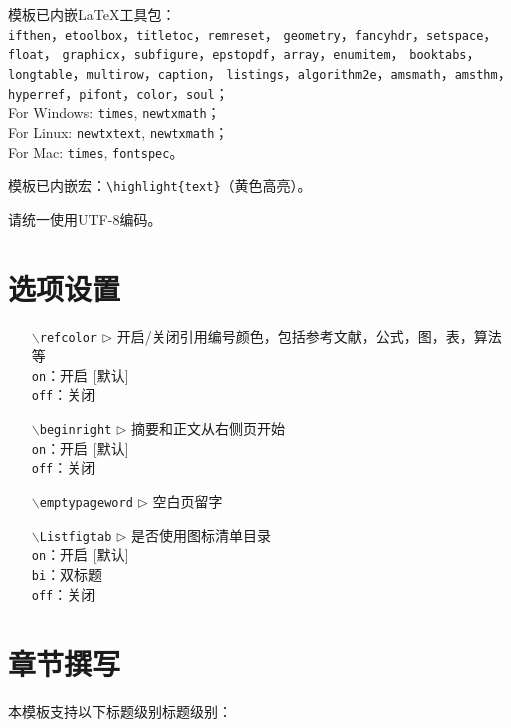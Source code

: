 \setlength{\hangindent}{4em}
模板已内嵌LaTeX工具包：\\
{\tt ifthen}，{\tt etoolbox}，{\tt titletoc}，{\tt remreset}，
{\tt geometry}，{\tt fancyhdr}，{\tt setspace}，{\tt float}，
{\tt graphicx}，{\tt subfigure}，{\tt epstopdf}，{\tt array}，{\tt enumitem}，
{\tt booktabs}，{\tt longtable}，{\tt multirow}，{\tt caption}，
{\tt listings}，{\tt algorithm2e}，{\tt amsmath}，{\tt amsthm}，
{\tt hyperref}，{\tt pifont}，{\tt color}，{\tt soul}；\\
For Windows: {\tt times}, {\tt newtxmath}；\\
For Linux: {\tt newtxtext}, {\tt newtxmath}；\\
For Mac: {\tt times}, {\tt fontspec}。


模板已内嵌宏：\verb|\highlight{text}|（黄色高亮）。

请统一使用UTF-8编码。



\section{选项设置}

\begin{itemize}[leftmargin=3cm]
  \item[{\tt  $\backslash$refcolor} $\triangleright$]  开启/关闭引用编号颜色，包括参考文献，公式，图，表，算法等\\
  \texttt{on}：开启 [默认]\\
  \texttt{off}：关闭
  \item[{\tt $\backslash$beginright} $\triangleright$]  摘要和正文从右侧页开始\\
  \texttt{on}：开启 [默认]\\
  \texttt{off}：关闭
  \item[{\tt $\backslash$emptypageword} $\triangleright$]  空白页留字
  \item[{\tt $\backslash$Listfigtab} $\triangleright$]  是否使用图标清单目录\\
  \texttt{on}：开启 [默认]\\
  \texttt{bi}：双标题\\
  \texttt{off}：关闭
\end{itemize}


\section{章节撰写}
本模板支持以下标题级别标题级别：

